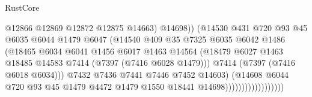 \begin{lexlean}{RustCore}
\begin{coremodule}
                                          @12866
                                          @12869
                                          @12872
                                          @12875
                                          @14663)
                                        @14698))
                                    (@14530
                                      @431
                                      @720
                                      @93
                                      @45
                                      @6035
                                      @6044
                                      @1479
                                      @6047
                                      (@14540
                                        @409
                                        @35
                                        @7325
                                        @6035
                                        @6042
                                        @1486
                                        (@18465
                                          @6034
                                          @6041
                                          @1456
                                          @6017
                                          @1463
                                          @14564
                                          (@18479
                                            @6027
                                            @1463
                                            @18485
                                            @14583
                                            @7414
                                            (@7397 (@7416 @6028 @1479)))
                                          @7414
                                          (@7397 (@7416 @6018 @6034)))
                                        @7432
                                        @7436
                                        @7441
                                        @7446
                                        @7452
                                        @14603)
                                      (@14608
                                        @6044
                                        @720
                                        @93
                                        @45
                                        @1479
                                        @4472
                                        @1479
                                        @1550
                                        @18441
                                        @14698))))))))))))))))))

\end{coremodule}
\end{lexlean}
